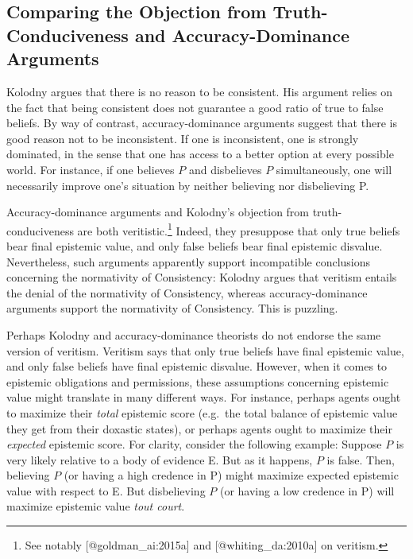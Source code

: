 \documentclass[
]{article}
\begin{document}
\hypertarget{PREFIXcomparing-the-objection-from-truth-conduciveness-and-accuracy-dominance-arguments}{%
\subsection{Comparing the Objection from Truth-Conduciveness and
Accuracy-Dominance
Arguments}\label{PREFIXcomparing-the-objection-from-truth-conduciveness-and-accuracy-dominance-arguments}}

Kolodny argues that there is no reason to be consistent. His argument
relies on the fact that being consistent does not guarantee a good ratio
of true to false beliefs. By way of contrast, accuracy-dominance
arguments suggest that there is good reason not to be inconsistent. If
one is inconsistent, one is strongly dominated, in the sense that one
has access to a better option at every possible world. For instance, if
one believes \(P\) and disbelieves \(P\) simultaneously, one will
necessarily improve one's situation by neither believing nor
disbelieving P.

Accuracy-dominance arguments and Kolodny's objection from
truth-conduciveness are both veritistic.\footnote{See notably
  {[}@goldman\_ai:2015a{]} and {[}@whiting\_da:2010a{]} on veritism.}
Indeed, they presuppose that only true beliefs bear final epistemic
value, and only false beliefs bear final epistemic disvalue.
Nevertheless, such arguments apparently support incompatible conclusions
concerning the normativity of Consistency: Kolodny argues that veritism
entails the denial of the normativity of Consistency, whereas
accuracy-dominance arguments support the normativity of Consistency.
This is puzzling.

Perhaps Kolodny and accuracy-dominance theorists do not endorse the same
version of veritism. Veritism says that only true beliefs have final
epistemic value, and only false beliefs have final epistemic disvalue.
However, when it comes to epistemic obligations and permissions, these
assumptions concerning epistemic value might translate in many different
ways. For instance, perhaps agents ought to maximize their \emph{total}
epistemic score (e.g.~the total balance of epistemic value they get from
their doxastic states), or perhaps agents ought to maximize their
\emph{expected} epistemic score. For clarity, consider the following
example: Suppose \(P\) is very likely relative to a body of evidence E.
But as it happens, \(P\) is false. Then, believing \(P\) (or having a
high credence in P) might maximize expected epistemic value with respect
to E. But disbelieving \(P\) (or having a low credence in P) will
maximize epistemic value \emph{tout court}.
\end{document}
